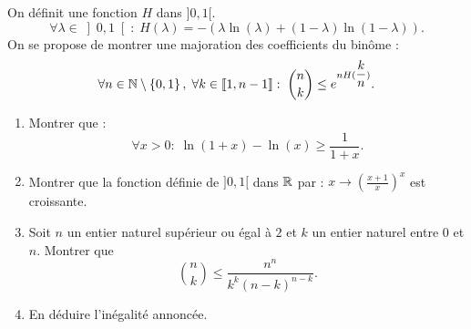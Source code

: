 On définit une fonction $H$ dans $]0,1[$.
\begin{displaymath}
 \forall \lambda\in \left]0,1 \right[:\; H(\lambda)= -\left( \lambda \ln (\lambda) + (1-\lambda) \ln (1-\lambda)\right) .
\end{displaymath}
On se propose de montrer une majoration des coefficients du binôme :
\begin{displaymath}
 \forall n \in \mathbb{N} \setminus\left\lbrace 0, 1\right\rbrace,\; \forall k\in \llbracket 1, n-1 \rrbracket:\;
\binom{n}{k}\leq e^{nH(\dfrac{k}{n})}.
\end{displaymath}
\begin{enumerate}
 \item Montrer que :
\begin{displaymath}
 \forall x>0 :\; \ln( 1+x) - \ln(x) \geq \frac{1}{1+x} .
\end{displaymath}
\item Montrer que la fonction définie de $]0,1[$ dans $\mathbb{R}$ par : $x \rightarrow\left( \frac{x+1}{x}\right)^x$ est croissante.
\item Soit $n$ un entier naturel supérieur ou égal à $2$ et $k$ un entier naturel entre $0$ et $n$. Montrer que
\begin{displaymath}
 \binom{n}{k}\leq \frac{n^n}{k^k(n-k)^{n-k}} .
\end{displaymath}
\item En déduire l'inégalité annoncée.

\end{enumerate}

